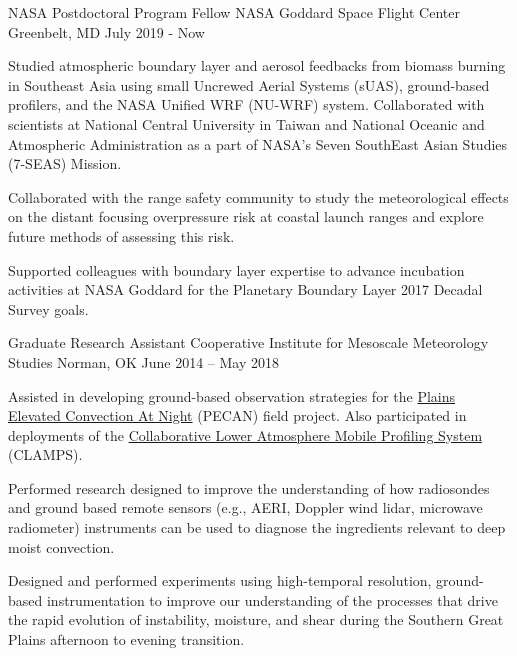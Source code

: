
\begin{cventries}
  \cventry
    {NASA Postdoctoral Program Fellow} %
    {NASA Goddard Space Flight Center} %
    {Greenbelt, MD} %
    {July 2019 - Now} %
    {
      \begin{cvitems} %
        \item {Studied atmospheric boundary layer and aerosol feedbacks from biomass burning in Southeast Asia using small Uncrewed Aerial Systems (sUAS), ground-based profilers, and the NASA Unified WRF (NU-WRF) system.  Collaborated with scientists at National Central University in Taiwan and National Oceanic and Atmospheric Administration as a part of NASA's Seven SouthEast Asian Studies (7-SEAS) Mission.}
        \item {Collaborated with the range safety community to study the meteorological effects on the distant focusing overpressure risk at coastal launch ranges and explore future methods of assessing this risk.}
        \item {Supported colleagues with boundary layer expertise to advance incubation activities at NASA Goddard for the Planetary Boundary Layer 2017 Decadal Survey goals.}
      \end{cvitems}
    }

  \cventry
    {Graduate Research Assistant} %
    {Cooperative Institute for Mesoscale Meteorology Studies} %
    {Norman, OK} %
    {June 2014 -- May 2018} %
    {
      \begin{cvitems} %
        \item {Assisted in developing ground-based observation strategies for the \href{https://www.eol.ucar.edu/field_projects/pecan}{Plains Elevated Convection At Night} (PECAN) field project.  Also participated in deployments of the \href{http://www.nssl.noaa.gov/users/dturner/public_html/CLAMPS/}{Collaborative Lower Atmosphere Mobile Profiling System} (CLAMPS).}
        \item {Performed research designed to improve the understanding of how radiosondes and ground based remote sensors (e.g., AERI, Doppler wind lidar, microwave radiometer) instruments can be used to diagnose the ingredients relevant to deep moist convection.}
        \item {Designed and performed experiments using high-temporal resolution, ground-based instrumentation to improve our understanding of the processes that drive the rapid evolution of instability, moisture, and shear during the Southern Great Plains afternoon to evening transition.}
      \end{cvitems}
    }


\end{cventries}
